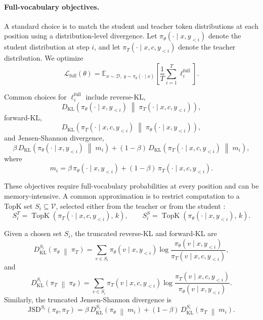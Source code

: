 \paragraph{Full-vocabulary objectives.}
\label{subsubsection:full_vocab_loss}

A standard choice is to match the student and teacher token distributions at
each position using a distribution-level divergence. Let
\(\pi_\theta(\cdot \mid x, y_{<i})\) denote the student distribution at step
\(i\), and let \(\pi_T(\cdot \mid x, c, y_{<i})\) denote the teacher
distribution. We optimize
\[
\mathcal{L}_{\mathrm{full}}(\theta)
=
\mathbb{E}_{x\sim\mathcal D,\; y\sim\pi_\theta(\cdot\mid x)}
\left[
\frac{1}{T}\sum_{i=1}^T \ell_i^{\mathrm{full}}
\right].
\]

Common choices for \(\ell_i^{\mathrm{full}}\) include reverse-KL,
\[
D_{\mathrm{KL}}\!\left(
\pi_\theta(\cdot\mid x,y_{<i})
\;\middle\|\;
\pi_T(\cdot\mid x,c,y_{<i})
\right),
\]
forward-KL,
\[
D_{\mathrm{KL}}\!\left(
\pi_T(\cdot\mid x,c,y_{<i})
\;\middle\|\;
\pi_\theta(\cdot\mid x,y_{<i})
\right),
\]
and Jensen-Shannon divergence,
\[
\beta\,
D_{\mathrm{KL}}\!\left(
\pi_\theta(\cdot\mid x,y_{<i})
\;\middle\|\;
m_i
\right)
+
(1-\beta)\,
D_{\mathrm{KL}}\!\left(
\pi_T(\cdot\mid x,c,y_{<i})
\;\middle\|\;
m_i
\right),
\]
where
\[
m_i
=
\beta\,\pi_\theta(\cdot\mid x,y_{<i})
+
(1-\beta)\,\pi_T(\cdot\mid x,c,y_{<i}).
\]

These objectives require full-vocabulary probabilities at every position and
can be memory-intensive. A common approximation is to restrict computation to a
TopK set \(S_i \subseteq \mathcal V\), selected either from the teacher \cite{fu2026revisitingonpolicydistillationempirical}
or from the student \cite{zhao2026selfdistilledreasoneronpolicyselfdistillation, hubotter2026reinforcementlearningselfdistillation}:
\[
S_i^{T}
=
\operatorname{TopK}\!\left(
\pi_T(\cdot\mid x,c,y_{<i}),\,k
\right),
\qquad
S_i^{S}
=
\operatorname{TopK}\!\left(
\pi_\theta(\cdot\mid x,y_{<i}),\,k
\right).
\]

Given a chosen set \(S_i\), the truncated reverse-KL and forward-KL are
\[
D_{\mathrm{KL}}^{S_i}\!\left(
\pi_\theta
\;\middle\|\;
\pi_T
\right)
=
\sum_{v\in S_i}
\pi_\theta(v\mid x,y_{<i})
\log
\frac{
\pi_\theta(v\mid x,y_{<i})
}{
\pi_T(v\mid x,c,y_{<i})
},
\]
and
\[
D_{\mathrm{KL}}^{S_i}\!\left(
\pi_T
\;\middle\|\;
\pi_\theta
\right)
=
\sum_{v\in S_i}
\pi_T(v\mid x,c,y_{<i})
\log
\frac{
\pi_T(v\mid x,c,y_{<i})
}{
\pi_\theta(v\mid x,y_{<i})
}.
\]
Similarly, the truncated Jensen-Shannon divergence is
\[
\mathrm{JSD}^{S_i}\!\left(
\pi_\theta,\pi_T
\right)
=
\beta\,
D_{\mathrm{KL}}^{S_i}\!\left(
\pi_\theta
\;\middle\|\;
m_i
\right)
+
(1-\beta)\,
D_{\mathrm{KL}}^{S_i}\!\left(
\pi_T
\;\middle\|\;
m_i
\right).
\]

